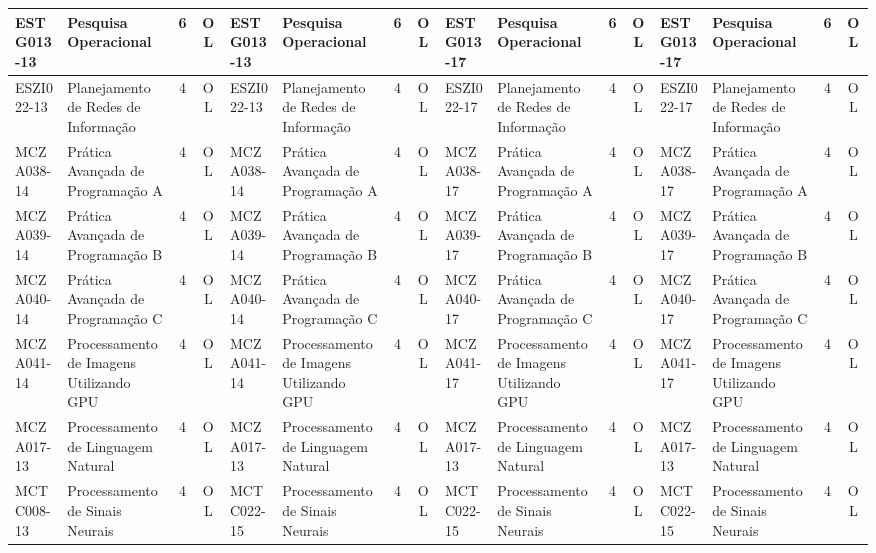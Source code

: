\documentclass[a4paper]{article}
\begin{document}
\begin{landscape}
{\begin{longtable}{|l|p{.15\textheight}|c|c||l|p{.15\textheight}|c|c||l|p{.15\textheight}|c|c||l|p{.15\textheight}|c|c|}
    ESTG013-13 & Pesquisa Operacional & 6 & OL &
    ESTG013-13 & Pesquisa Operacional & 6 & OL &
    ESTG013-17 & Pesquisa Operacional & 6 & OL &
    ESTG013-17 & Pesquisa Operacional & 6 & OL \\ \hline
    
    ESZI022-13 & Planejamento de Redes de Informação & 4 & OL &
    ESZI022-13 & Planejamento de Redes de Informação & 4 & OL &
    ESZI022-17 & Planejamento de Redes de Informação & 4 & OL &
    ESZI022-17 & Planejamento de Redes de Informação & 4 & OL \\ \hline
    
    MCZA038-14 & Prática Avançada de Programação A & 4 & OL &
    MCZA038-14 & Prática Avançada de Programação A & 4 & OL &
    MCZA038-17 & Prática Avançada de Programação A & 4 & OL &
    MCZA038-17 & Prática Avançada de Programação A & 4 & OL \\ \hline
    
    MCZA039-14 & Prática Avançada de Programação B & 4 & OL &
    MCZA039-14 & Prática Avançada de Programação B & 4 & OL &
    MCZA039-17 & Prática Avançada de Programação B & 4 & OL & 
    MCZA039-17 & Prática Avançada de Programação B & 4 & OL \\ \hline
    
    MCZA040-14 & Prática Avançada de Programação C & 4 & OL &
    MCZA040-14 & Prática Avançada de Programação C & 4 & OL &
    MCZA040-17 & Prática Avançada de Programação C & 4 & OL &
    MCZA040-17 & Prática Avançada de Programação C & 4 & OL \\ \hline
    
    MCZA041-14 & Processamento de Imagens Utilizando GPU & 4 & OL &
    MCZA041-14 & Processamento de Imagens Utilizando GPU & 4 & OL &
    MCZA041-17 & Processamento de Imagens Utilizando GPU & 4 & OL & 
    MCZA041-17 & Processamento de Imagens Utilizando GPU & 4 & OL \\ \hline
    
    MCZA017-13 & Processamento de Linguagem Natural & 4 & OL &
    MCZA017-13 & Processamento de Linguagem Natural & 4 & OL &
    MCZA017-13 & Processamento de Linguagem Natural & 4 & OL &
    MCZA017-13 & Processamento de Linguagem Natural & 4 & OL \\ \hline
    
    MCTC008-13 & Processamento de Sinais Neurais & 4 & OL &
    MCTC022-15 & Processamento de Sinais Neurais & 4 & OL &
    MCTC022-15 & Processamento de Sinais Neurais & 4 & OL &
    MCTC022-15 & Processamento de Sinais Neurais & 4 & OL \\ \hline
    

\end{longtable}}
\end{landscape}
\end{document}
